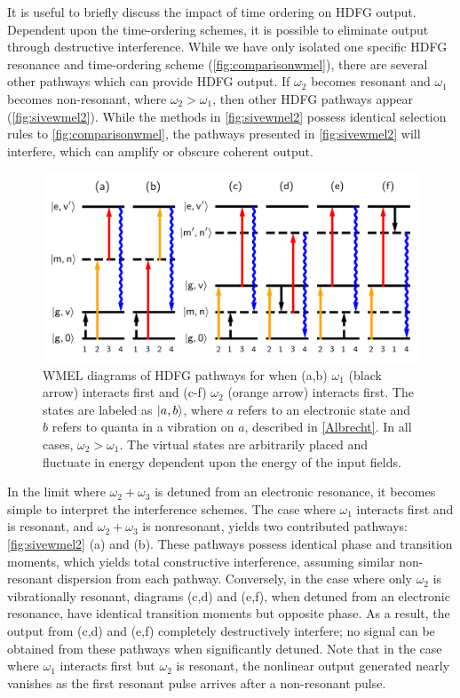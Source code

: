 \documentclass[aip, jcp, reprint, onecolumn, nofootinbib]{revtex4-2}
\begin{document}
It is useful to briefly discuss the impact of time ordering on HDFG output.
Dependent upon the time-ordering schemes, it is possible to eliminate output through destructive interference.\cite{RN287}
While we have only isolated one specific HDFG resonance and time-ordering scheme (\autoref{fig:comparisonwmel}), there are several other pathways which can provide HDFG output. \cite{RN352}
If $\omega_2$ becomes resonant and $\omega_1$ becomes non-resonant, where $\omega_2 > \omega_1$, then other HDFG pathways appear (\autoref{fig:sivewmel2}).\cite{McDonnell2024} 
While the methods in \autoref{fig:sivewmel2} possess identical selection rules to \autoref{fig:comparisonwmel}, the pathways presented in \autoref{fig:sivewmel2} will interfere, which can amplify or obscure coherent output.
\begin{figure}[!htbp]
	\centering
	\includegraphics[width=6.66 in]{figures/timeorderedwmel.png}
	\caption{WMEL diagrams of HDFG pathways for when (a,b) $\omega_1$ (black arrow) interacts first and (c-f) $\omega_2$ (orange arrow) interacts first. 
		The states are labeled as $\ket{a,b}$, where $a$ refers to an electronic state and $b$ refers to quanta in a vibration on $a$, described in \autoref{Albrecht}.
		In all cases, $\omega_2 > \omega_1$.
		The virtual states are arbitrarily placed and fluctuate in energy dependent upon the energy of the input fields.
	}
	\label{fig:sivewmel2}
\end{figure}

In the limit where $\omega_2+\omega_3$ is detuned from an electronic resonance, it becomes simple to interpret the interference schemes. 
The case where $\omega_1$ interacts first and is resonant, and $\omega_2 + \omega_3$ is nonresonant, yields two contributed pathways: \autoref{fig:sivewmel2} (a) and (b).
These pathways possess identical phase and transition moments, which yields total constructive interference, assuming similar non-resonant dispersion from each pathway.
Conversely, in the case where only $\omega_2$ is vibrationally resonant, diagrams (c,d) and (e,f), when detuned from an electronic resonance, have identical transition moments but opposite phase. 
As a result, the output from (c,d) and (e,f) completely destructively interfere; no signal can be obtained from these pathways when significantly detuned. \cite{RN287, McDonnell2024}
Note that in the case where $\omega_1$ interacts first but $\omega_2$ is resonant, the nonlinear output generated nearly vanishes as the first resonant pulse arrives after a non-resonant pulse.
\end{document}
